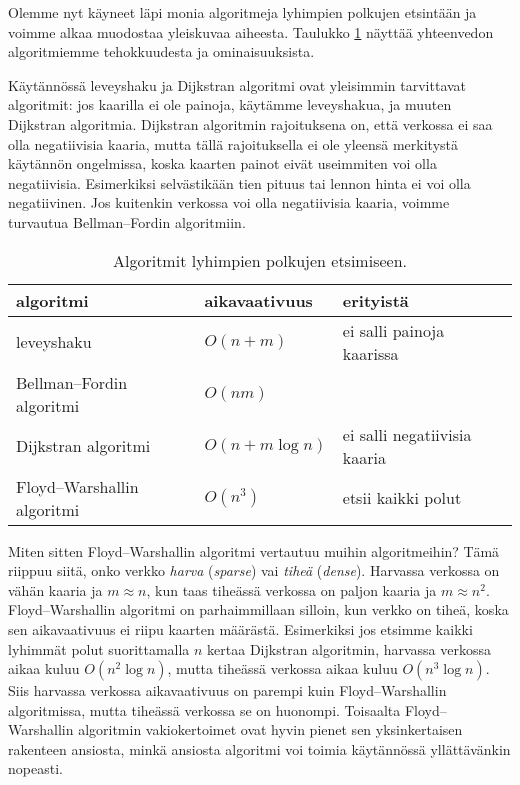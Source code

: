 Olemme nyt käyneet läpi monia algoritmeja
lyhimpien polkujen etsintään ja voimme alkaa
muodostaa yleiskuvaa aiheesta.
Taulukko \ref{tab:reiver} näyttää yhteenvedon
algoritmiemme tehokkuudesta ja ominaisuuksista.

Käytännössä leveyshaku ja Dijkstran algoritmi ovat
yleisimmin tarvittavat algoritmit:
jos kaarilla ei ole painoja, käytämme leveyshakua,
ja muuten Dijkstran algoritmia.
Dijkstran algoritmin rajoituksena on,
että verkossa ei saa olla negatiivisia kaaria,
mutta tällä rajoituksella ei ole yleensä merkitystä
käytännön ongelmissa, koska kaarten painot eivät
useimmiten voi olla negatiivisia.
Esimerkiksi selvästikään tien pituus tai lennon hinta
ei voi olla negatiivinen.
Jos kuitenkin verkossa voi olla negatiivisia kaaria,
voimme turvautua Bellman–Fordin algoritmiin.

\begin{table}
\center
\begin{tabular}{lll}
algoritmi & aikavaativuus & erityistä \\
\hline
leveyshaku & $O(n+m)$ & ei salli painoja kaarissa \\
Bellman–Fordin algoritmi & $O(nm)$ & \\
Dijkstran algoritmi & $O(n+m \log n)$ & ei salli negatiivisia kaaria \\
Floyd–Warshallin algoritmi & $O(n^3)$ & etsii kaikki polut \\
\end{tabular}
\caption{Algoritmit lyhimpien polkujen etsimiseen.}
\label{tab:reiver}
\end{table}


Miten sitten Floyd–Warshallin algoritmi vertautuu muihin algoritmeihin?
Tämä riippuu siitä, onko verkko \emph{harva} (\emph{sparse}) vai
\emph{tiheä} (\emph{dense}).
Harvassa verkossa on vähän kaaria ja $m \approx n$,
kun taas tiheässä verkossa on paljon kaaria ja $m \approx n^2$.
Floyd–Warshallin algoritmi on parhaimmillaan silloin,
kun verkko on tiheä, koska sen aikavaativuus ei riipu
kaarten määrästä.
Esimerkiksi jos etsimme kaikki lyhimmät polut
suorittamalla $n$ kertaa Dijkstran algoritmin,
harvassa verkossa aikaa kuluu $O(n^2 \log n)$,
mutta tiheässä verkossa aikaa kuluu $O(n^3 \log n)$.
Siis harvassa verkossa aikavaativuus on parempi
kuin Floyd–Warshallin algoritmissa,
mutta tiheässä verkossa se on huonompi.
Toisaalta Floyd–Warshallin algoritmin vakiokertoimet
ovat hyvin pienet sen yksinkertaisen rakenteen ansiosta,
minkä ansiosta algoritmi voi toimia käytännössä
yllättävänkin nopeasti.
